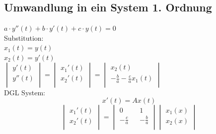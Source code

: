 \subsection{Umwandlung in ein System 1. Ordnung}
$a \cdot y''(t) + b \cdot y'(t) + c \cdot y(t) = 0$\\
Substitution:\\
$x_1(t) = y(t)$\\
$x_2(t) = y'(t)$\\
$
	\begin{vmatrix} 
	        y'(t)\\ 
	        y''(t)\\   
	\end{vmatrix}
	=
	\begin{vmatrix} 
	        x_1'(t)\\ 
	        x_2'(t)\\   
	\end{vmatrix}
	=
	\begin{vmatrix} 
	        x_2(t)\\ 
	        -\frac{b}{a} - \frac{c}{a}x_1(t)\\   
	\end{vmatrix}
$\\
DGL System:\\
\begin{equation*}
x'(t) = Ax(t)
\end{equation*}
\begin{equation*}
	\begin{vmatrix} 
	        x_1'(t)\\ 
	        x_2'(t)\\   
	\end{vmatrix}
	=
	\begin{vmatrix} 
	        0 && 1\\ 
	       -\frac{c}{a} && -\frac{b}{a}\\   
	\end{vmatrix}
	\begin{vmatrix} 
	        x_1(x)\\ 
	        x_2(x)\\   
	\end{vmatrix}
\end{equation*}

